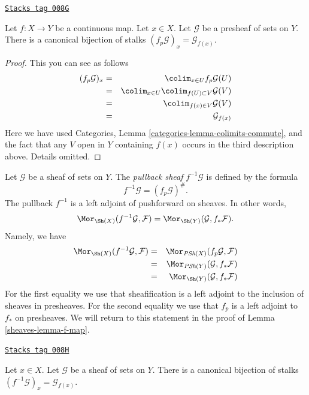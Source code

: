 \begin{lemma}
\label{sheaves-lemma-stalk-pullback-presheaf}
\href{https://stacks.math.columbia.edu/tag/008G}{\texttt{Stacks tag 008G}}

Let $f : X \to Y$ be a continuous map.
Let $x \in X$. Let $\mathcal{G}$ be a presheaf of sets on $Y$.
There is a canonical bijection of stalks
$(f_p\mathcal{G})_x = \mathcal{G}_{f(x)}$.
\end{lemma}

\begin{proof}
This you can see as follows
\begin{eqnarray*}
(f_p\mathcal{G})_x
& = &
\colim_{x \in U} f_p\mathcal{G}(U) \\
& = &
\colim_{x \in U} \colim_{f(U) \subset V} \mathcal{G}(V) \\
& = &
\colim_{f(x) \in V} \mathcal{G}(V) \\
& = &
\mathcal{G}_{f(x)}
\end{eqnarray*}
Here we have used
Categories, Lemma \ref{categories-lemma-colimits-commute},
and the fact that any $V$ open in $Y$ containing $f(x)$
occurs in the third description above. Details omitted.
\end{proof}

Let $\mathcal{G}$ be a sheaf of sets on $Y$.
The {\it pullback sheaf} $f^{-1}\mathcal{G}$ is defined
by the formula
$$
f^{-1}\mathcal{G} = (f_p\mathcal{G})^\# .
$$
The pullback $f^{-1}$ is a left adjoint of
pushforward on sheaves. In other words,
$$
\Mor_{\Sh(X)}(f^{-1}\mathcal{G}, \mathcal{F})
=
\Mor_{\Sh(Y)}(\mathcal{G}, f_*\mathcal{F}).
$$
Namely, we have
\begin{eqnarray*}
\Mor_{\Sh(X)}(f^{-1}\mathcal{G}, \mathcal{F})
& = &
\Mor_{\textit{PSh}(X)}(f_p\mathcal{G}, \mathcal{F}) \\
& = &
\Mor_{\textit{PSh}(Y)}(\mathcal{G}, f_*\mathcal{F}) \\
& = &
\Mor_{\Sh(Y)}(\mathcal{G}, f_*\mathcal{F})
\end{eqnarray*}
For the first equality we use that sheafification is a left adjoint
to the inclusion of sheaves in presheaves. For the second equality
we use that $f_p$ is a left adjoint to $f_*$ on presheaves. We will return
to this statement in the proof of Lemma \ref{sheaves-lemma-f-map}.

\begin{lemma}
\label{sheaves-lemma-stalk-pullback}
\href{https://stacks.math.columbia.edu/tag/008H}{\texttt{Stacks tag 008H}}

Let $x \in X$. Let $\mathcal{G}$ be a sheaf of sets on $Y$.
There is a canonical bijection of stalks
$(f^{-1}\mathcal{G})_x = \mathcal{G}_{f(x)}$.
\end{lemma}

